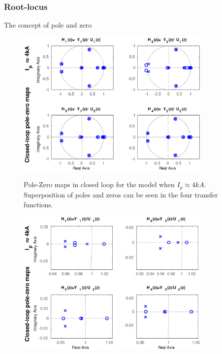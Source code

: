 \subsubsection{Root-locus}

The concept of pole and zero 
\begin{figure}
	\centering
	\includegraphics[width=0.85\textwidth]{Chp5/PoleZero/PoleZeroClosePos.eps}
	\label{PoleZeroClosePos}
	\caption{Pole-Zero maps in closed loop for the model when $I_p\approx 4 kA$. Superposition  of poles and zeros can be seen in the four transfer functions.}
\end{figure}	

\begin{figure}
	\centering
	\includegraphics[width=0.85\textwidth]{Chp5/PoleZero/PoleZeroClosePosZoom.eps}
	\label{PoleZeroClosePosZoom}
\end{figure}	


